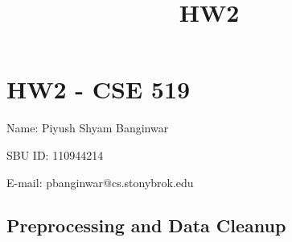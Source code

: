 \documentclass[11pt]{article}
\title{HW2}
\begin{document}
    
    
    \maketitle
    
    

    
    \section{HW2 - CSE 519}\label{hw2---cse-519}

Name: Piyush Shyam Banginwar

SBU ID: 110944214

E-mail: pbanginwar@cs.stonybrok.edu

    \subsection{Preprocessing and Data
Cleanup}\label{preprocessing-and-data-cleanup}
\end{document}
